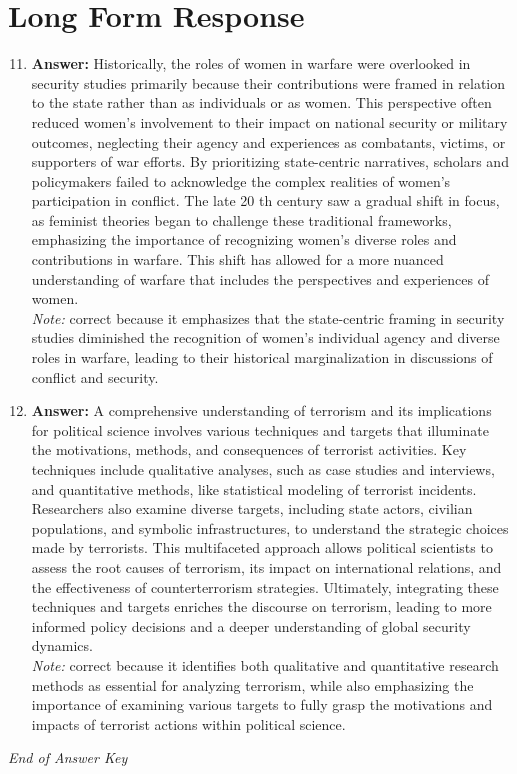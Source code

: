 \documentclass[12pt]{article}
\begin{document}
\section*{Long Form Response}
\begin{enumerate}[label=\arabic*.]
\setcounter{enumi}{10}
\item \textbf{Answer:} Historically, the roles of women in warfare were overlooked in security studies primarily because their contributions were framed in relation to the state rather than as individuals or as women. This perspective often reduced women's involvement to their impact on national security or military outcomes, neglecting their agency and experiences as combatants, victims, or supporters of war efforts. By prioritizing state-centric narratives, scholars and policymakers failed to acknowledge the complex realities of women's participation in conflict. The late 20 th century saw a gradual shift in focus, as feminist theories began to challenge these traditional frameworks, emphasizing the importance of recognizing women's diverse roles and contributions in warfare. This shift has allowed for a more nuanced understanding of warfare that includes the perspectives and experiences of women.
\\ \textit{Note:} correct because it emphasizes that the state-centric framing in security studies diminished the recognition of women's individual agency and diverse roles in warfare, leading to their historical marginalization in discussions of conflict and security.
\item \textbf{Answer:} A comprehensive understanding of terrorism and its implications for political science involves various techniques and targets that illuminate the motivations, methods, and consequences of terrorist activities. Key techniques include qualitative analyses, such as case studies and interviews, and quantitative methods, like statistical modeling of terrorist incidents. Researchers also examine diverse targets, including state actors, civilian populations, and symbolic infrastructures, to understand the strategic choices made by terrorists. This multifaceted approach allows political scientists to assess the root causes of terrorism, its impact on international relations, and the effectiveness of counterterrorism strategies. Ultimately, integrating these techniques and targets enriches the discourse on terrorism, leading to more informed policy decisions and a deeper understanding of global security dynamics.
\\ \textit{Note:} correct because it identifies both qualitative and quantitative research methods as essential for analyzing terrorism, while also emphasizing the importance of examining various targets to fully grasp the motivations and impacts of terrorist actions within political science.
\end{enumerate}

\vfill
\noindent\textit{End of Answer Key}
\end{document}
